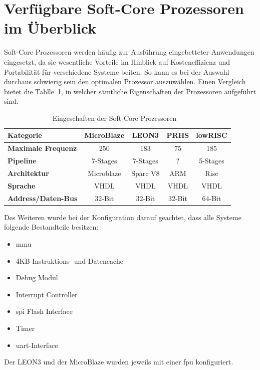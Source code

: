 \section{Verfügbare Soft-Core Prozessoren im Überblick}\label{kap:überblick}
Soft-Core Prozessoren werden häufig zur Ausführung eingebetteter Anwendungen eingesetzt, da sie wesentliche Vorteile im Hinblick auf Kosteneffizienz und Portabilität für verschiedene Systeme
beiten. So kann es bei der Auswahl durchaus schwierig sein den optimalen Prozessor auszuwählen. Einen Vergleich bietet die Tablle~\ref{tab:features}, in welcher sämtliche Eigenschaften
der Prozessoren aufgeführt sind.\\

\begin{table}[H]
\centering
\begin{tabular}{|l|c|c|c|c|}
  \hline
  \textbf{Kategorie} & \textbf{MicroBlaze} & \textbf{LEON3}& \textbf{PRHS}& \textbf{lowRISC}\\
  \hline
  \textbf{Maximale Frequenz} &250 & 183 & 75 & 185\\
  \hline
  \textbf{Pipeline} & 7-Stages & 7-Stages & ? & 5-Stages\\
  \hline
  \textbf{Architektur} & Microblaze & Sparc V8  & ARM &  Risc\\
  \hline
  \textbf{Sprache} & VHDL & VHDL & VHDL & VHDL\\
    \hline
  \textbf{Address/Daten-Bus} & 32-Bit & 32-Bit & 32-Bit & 64-Bit\\
      \hline
\end{tabular}
  \caption{Eingeschaften der Soft-Core Prozessoren ~\cite{comparison}}
 \label{tab:features}
  \end{table}

Des Weiteren wurde bei der Konfiguration darauf geachtet, dass alle Systeme folgende Bestandteile besitzen:\\
\begin{itemize}
  \item \ac{mmu}
  \item 4KB Instruktions- und Datencache
  \item Debug Modul
  \item Interrupt Controller
  \item \ac{spi} Flash Interface
  \item Timer
  \item \ac{uart}-Interface
\end{itemize}

Der LEON3 und der MicroBlaze wurden jeweils mit einer \ac{fpu} konfiguriert.

